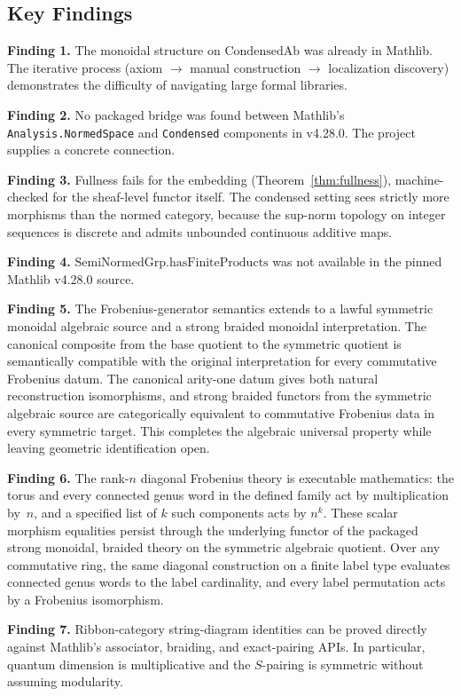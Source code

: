 \documentclass[11pt]{amsart}
\theoremstyle{plain}
\theoremstyle{definition}
\newcommand{\CondAb}{\mathrm{CondensedAb}}
\newcommand{\SemiNormedGrp}{\mathrm{SemiNormedGrp}}
\begin{document}
\subsection{Key Findings}

\textbf{Finding 1.} The monoidal structure on $\CondAb$ was already in Mathlib. The iterative process (axiom $\to$ manual construction $\to$ localization discovery) demonstrates the difficulty of navigating large formal libraries.

\textbf{Finding 2.} No packaged bridge was found between Mathlib's \texttt{Analysis.NormedSpace} and \texttt{Condensed} components in v4.28.0. The project supplies a concrete connection.

\textbf{Finding 3.} Fullness fails for the embedding (Theorem~\ref{thm:fullness}), machine-checked for the sheaf-level functor itself. The condensed setting sees strictly more morphisms than the normed category, because the sup-norm topology on integer sequences is discrete and admits unbounded continuous additive maps.

\textbf{Finding 4.} $\SemiNormedGrp.\mathrm{hasFiniteProducts}$ was not available in the pinned Mathlib v4.28.0 source.

\textbf{Finding 5.} The Frobenius-generator semantics extends to a lawful symmetric monoidal algebraic source and a strong braided monoidal interpretation. The canonical composite from the base quotient to the symmetric quotient is semantically compatible with the original interpretation for every commutative Frobenius datum. The canonical arity-one datum gives both natural reconstruction isomorphisms, and strong braided functors from the symmetric algebraic source are categorically equivalent to commutative Frobenius data in every symmetric target. This completes the algebraic universal property while leaving geometric identification open.

\textbf{Finding 6.} The rank-$n$ diagonal Frobenius theory is executable mathematics: the torus and every connected genus word in the defined family act by multiplication by~$n$, and a specified list of $k$ such components acts by $n^k$.  These scalar morphism equalities persist through the underlying functor of the packaged strong monoidal, braided theory on the symmetric algebraic quotient. Over any commutative ring, the same diagonal construction on a finite label type evaluates connected genus words to the label cardinality, and every label permutation acts by a Frobenius isomorphism.

\textbf{Finding 7.} Ribbon-category string-diagram identities can be proved directly against Mathlib's associator, braiding, and exact-pairing APIs. In particular, quantum dimension is multiplicative and the $S$-pairing is symmetric without assuming modularity.
\end{document}
